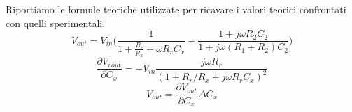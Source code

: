 \documentclass[12pt,]{article}
\begin{document}
\newpage
\renewcommand{\appendixtocname}{Appendice}
\renewcommand{\appendixpagename}{Appendice}
\begin{appendices}
Riportiamo le formule teoriche utilizzate per ricavare i valori teorici confrontati con quelli sperimentali.
\begin{equation}
V_{out}= V_{in} \biggl(\frac{1}{1+ \frac{R_r}{R_x} + \omega R_r C_x } - \frac{1+j \omega R_2 C_2}{1 + j \omega (R_1 + R_2 ) C_2} \biggr)
\end{equation}
\begin{equation}
\frac{\partial V_{vout}}{\partial C_x} = -V_{in} \frac{j\omega R_r}{(1+ R_r/R_x +j\omega R_r C_x)^2}
\end{equation}
\begin{equation}
V_{out}= \frac{\partial {V_{out}}}{\partial {C_x}} \Delta{C_x}
\end{equation}
\end{appendices}
\end{document}
